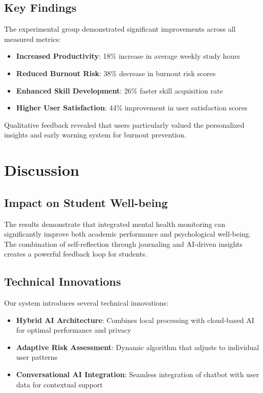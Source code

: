 \documentclass[conference,10pt]{IEEEtran}
\begin{document}
\subsection{Key Findings}

The experimental group demonstrated significant improvements across all measured metrics:

\begin{itemize}
\item \textbf{Increased Productivity}: 18\% increase in average weekly study hours
\item \textbf{Reduced Burnout Risk}: 38\% decrease in burnout risk scores
\item \textbf{Enhanced Skill Development}: 26\% faster skill acquisition rate
\item \textbf{Higher User Satisfaction}: 44\% improvement in user satisfaction scores
\end{itemize}

Qualitative feedback revealed that users particularly valued the personalized insights and early warning system for burnout prevention.

\section{Discussion}

\subsection{Impact on Student Well-being}

The results demonstrate that integrated mental health monitoring can significantly improve both academic performance and psychological well-being. The combination of self-reflection through journaling and AI-driven insights creates a powerful feedback loop for students.

\subsection{Technical Innovations}

Our system introduces several technical innovations:

\begin{itemize}
\item \textbf{Hybrid AI Architecture}: Combines local processing with cloud-based AI for optimal performance and privacy
\item \textbf{Adaptive Risk Assessment}: Dynamic algorithm that adjusts to individual user patterns
\item \textbf{Conversational AI Integration}: Seamless integration of chatbot with user data for contextual support
\end{itemize}
\end{document}
